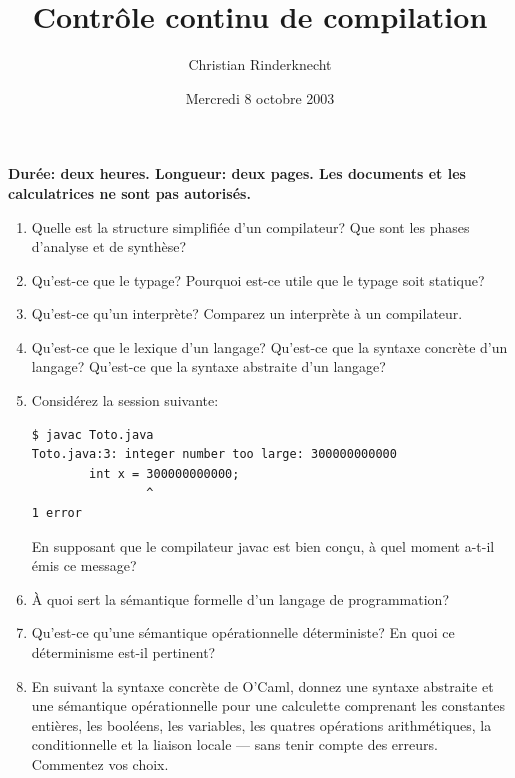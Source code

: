\documentclass[10pt,a4paper]{article}
\title{Contrôle continu de compilation}
\author{Christian Rinderknecht}
\date{Mercredi 8 octobre 2003}
\begin{document}
\maketitle

\noindent
\textbf{Durée: deux heures. Longueur: deux pages. Les documents et les
calculatrices ne sont pas autorisés.}

\smallskip


\bigskip

\begin{enumerate}

  \item Quelle est la structure simplifiée d'un compilateur? Que sont
  les phases d'analyse et de synthèse?

  \item Qu'est-ce que le typage? Pourquoi est-ce utile que le typage
  soit statique?

  \item Qu'est-ce qu'un interprète? Comparez un interprète à un
  compilateur.

  \item Qu'est-ce que le lexique d'un langage? Qu'est-ce que la
  syntaxe concrète d'un langage? Qu'est-ce que la syntaxe abstraite
  d'un langage?

  \item Considérez la session suivante:
  {\small
  \begin{verbatim}
$ javac Toto.java
Toto.java:3: integer number too large: 300000000000
        int x = 300000000000;
                ^
1 error
  \end{verbatim}
  }

  En supposant que le compilateur \textsf{javac} est bien conçu, à
  quel moment a-t-il émis ce message?

  \item À quoi sert la sémantique formelle d'un langage de
  programmation?

  \item Qu'est-ce qu'une sémantique opérationnelle déterministe? En
  quoi ce déterminisme est-il pertinent?

  \item En suivant la syntaxe concrète de O'Caml, donnez une syntaxe
  abstraite et une sémantique opérationnelle pour une calculette
  comprenant les cons\-tan\-tes entières, les booléens, les variables,
  les quatres opérations arithmétiques, la conditionnelle et la
  liaison locale --- sans tenir compte des erreurs. Commentez vos
  choix.


\end{enumerate}
\end{document}
